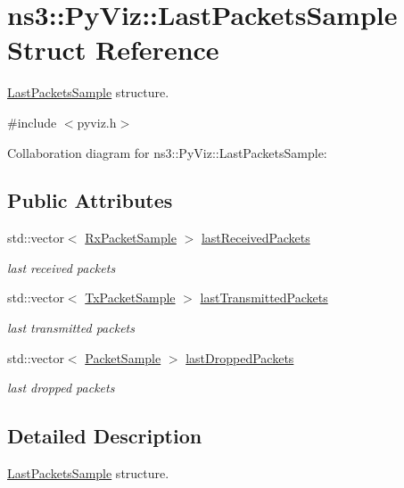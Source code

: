 \hypertarget{structns3_1_1PyViz_1_1LastPacketsSample}{}\section{ns3\+:\+:Py\+Viz\+:\+:Last\+Packets\+Sample Struct Reference}
\label{structns3_1_1PyViz_1_1LastPacketsSample}


\hyperlink{structns3_1_1PyViz_1_1LastPacketsSample}{Last\+Packets\+Sample} structure.  




{\ttfamily \#include $<$pyviz.\+h$>$}



Collaboration diagram for ns3\+:\+:Py\+Viz\+:\+:Last\+Packets\+Sample\+:
\subsection*{Public Attributes}
\begin{DoxyCompactItemize}
\item 
std\+::vector$<$ \hyperlink{structns3_1_1PyViz_1_1RxPacketSample}{Rx\+Packet\+Sample} $>$ \hyperlink{structns3_1_1PyViz_1_1LastPacketsSample_a9ec164d0f5c8e1db960388fed89b74ad}{last\+Received\+Packets}
\begin{DoxyCompactList}\small\item\em last received packets \end{DoxyCompactList}\item 
std\+::vector$<$ \hyperlink{structns3_1_1PyViz_1_1TxPacketSample}{Tx\+Packet\+Sample} $>$ \hyperlink{structns3_1_1PyViz_1_1LastPacketsSample_a9b2c257224892a935b1c5448d04d44c3}{last\+Transmitted\+Packets}
\begin{DoxyCompactList}\small\item\em last transmitted packets \end{DoxyCompactList}\item 
std\+::vector$<$ \hyperlink{structns3_1_1PyViz_1_1PacketSample}{Packet\+Sample} $>$ \hyperlink{structns3_1_1PyViz_1_1LastPacketsSample_a1c8ee7a178401b96aa8810767aa079d4}{last\+Dropped\+Packets}
\begin{DoxyCompactList}\small\item\em last dropped packets \end{DoxyCompactList}\end{DoxyCompactItemize}


\subsection{Detailed Description}
\hyperlink{structns3_1_1PyViz_1_1LastPacketsSample}{Last\+Packets\+Sample} structure. 

